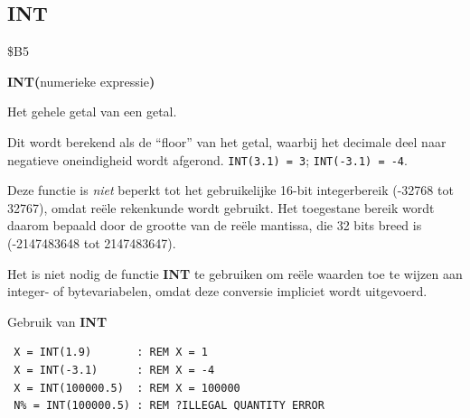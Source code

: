 
\newpage
\subsection{INT}
\begin{description}[leftmargin=2cm,style=nextline]
\item [Token:]    \$B5

\item [Formaat:]   {\bf INT(}numerieke expressie{\bf)}

\item [Retourneert:]  Het gehele getal van een getal.

                  Dit wordt berekend als de ``floor'' van het getal, waarbij het decimale deel naar negatieve oneindigheid wordt afgerond. \texttt{INT(3.1) = 3}; \texttt{INT(-3.1) = -4}.

                  Deze functie is \emph{niet} beperkt tot het gebruikelijke 16-bit integerbereik (-32768 tot 32767), omdat reële rekenkunde wordt gebruikt. Het toegestane bereik wordt daarom bepaald door de grootte van de reële mantissa, die 32 bits breed is (-2147483648 tot 2147483647).

\item [Opmerkingen:]  Het is niet nodig de functie {\bf INT} te gebruiken om reële waarden toe te wijzen aan integer- of bytevariabelen, omdat deze conversie impliciet wordt uitgevoerd.

\item [Voorbeelden:] Gebruik van {\bf INT}

\begin{tcolorbox}[colback=black,coltext=white]
\verbatimfont{\codefont}
\begin{verbatim}
 X = INT(1.9)       : REM X = 1
 X = INT(-3.1)      : REM X = -4
 X = INT(100000.5)  : REM X = 100000
 N% = INT(100000.5) : REM ?ILLEGAL QUANTITY ERROR
\end{verbatim}
\end{tcolorbox}
\end{description}


\newpage
